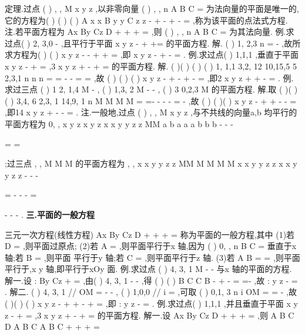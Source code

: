 \textcolor{lyred}{定理}.过点
(
)
,
,
M
x
y z
,以非零向量
(
)
, ,
n
A B C
=
\rho 
为法向量的平面\Pi 是唯一的, 
它的方程为(
)
(
)
(
)
A x
x
B y
y
C z
z
-
+
-
+
-
=
,称为该平面的\textcolor{lyred}{点法式方程}. 
\textcolor{lyred}{注}.若平面方程为
Ax
By
Cz
D
+
+
+
=
,则
(
)
, ,
n
A B C
=
\rho 
为其法向量. 
\textcolor{lyred}{例}.求过点(
)
2, 3,0
-
,且平行于平面
x
y
z
-
+
+=
的平面方程. 
解.
(
)
1, 2,3
n =
-
\rho 
,故所求方程为(
)
(
)
x
y
z
-
-
+
+
=
,即
x
y
z
-
+
-
=
. 
\textcolor{lyred}{例}.求过点(
)
1,1,1 ,垂直于平面
x
y
z
-
+
=
,3
x
y
z
+
-
+
=
的平面方程. 
解.
(
)(
)
(
)
(
)
1, 1,1
3,2, 12
10,15,5
5 2,3,1
n
n
n
=
\times 
=
-
\times 
-
=
=
\rho 
\rho 
\rho 
,故 
(
)
(
)
(
)
x
y
z
\cdots 
-
+\cdots 
-
+\cdots 
-
=
,即2
x
y
z
+
+
-
=
. 
\textcolor{lyred}{例}.求过三点
(
)
1 2, 1,4
M
-
,
(
)
1,3, 2
M
-
-
,
(
)
3 0,2,3
M
的平面方程. 
解.取
(
)(
)
(
)
3,4, 6
2,3, 1
14,9, 1
n
M M
M M
=
\times 
=-
-
\times -
-
=
-
\xi \xi \xi \xi \xi \xi \rho 
\xi \xi \xi \xi \xi \xi \rho 
\rho 
,故 
(
)
(
)(
)
x
y
z
\cdots 
-
+\cdots 
+
-
-
=
,即14
x
y
z
+
-
-
=
. 
\textcolor{lyred}{注}.一般地,过点
(
)
,
,
M
x
y z
,与不共线的向量a\rho ,b
\rho 
均平行的平面方程为 
0, ,
x
y
z
x
y
z
x x
y y
z z
MM a b
a
a
a
b
b
b
-
-
-

=\Leftrightarrow 
=


\xi \xi \xi \xi \xi \rho 
\rho 
\rho 
;过三点
,
,
M M
M 的平面方程为
,
,
x
x
y
y
z
z
MM M M M M
x
x
y
y
z
z
x
x
y
y
z
z
-
-
-

=
\Leftrightarrow 
-
-
-
=


-
-
-
\xi \xi \xi \xi \xi \rho \xi \xi \xi \xi \xi \xi \rho \xi \xi \xi \xi \xi \xi \rho 
. 
\vspace{4pt}
{\bfseries \textcolor{lyred}{三.平面的一般方程}}

三元一次方程(线性方程)
Ax
By
Cz
D
+
+
+
=
称为平面的\textcolor{lyred}{一般方程},其中 
(1)若
D =
,则平面过原点; 
(2)若
A =
,则平面平行于x 轴,因为
(
)
0, ,
n
B C
=
\rho 
垂直于x 轴;若
B =
,则平面 
平行于y 轴;若
C =
,则平面平行于z 轴. 
(3)若
A
B
=
=
,则平面平行于,x y 轴,即平行于xOy 面. 
\textcolor{lyred}{例}.求过点
(
)
4, 3, 1
M
-
-
与x 轴的平面\Pi 的方程. 
解一.设
:
By
Cz
\Pi 
+
=
,由(
)
4, 3, 1
-
-
\in \Pi ,得
(
)
(
)
B
C
C
B
-
+
-
=
\Rightarrow 
=-
,故 
:
y
z
\Pi 
-
=
. 
解二.
(
)
4, 3, 1 //
OM =
-
-
\Pi 
\xi \xi \xi \xi \rho 
,
(
)
1,0,0 //
i =
\Pi 
\rho 
,可取
(
)
0,1, 3
n
i
OM
=\times 
=
-
\xi \xi \xi \xi \rho 
\rho 
\rho 
,故 
(
)(
)
(
)
x
y
z
\cdots 
-
+
+
-\cdots 
+
=
,即
:
y
z
\Pi 
-
=
. 
\textcolor{lyred}{例}.求过点(
)
1,1,1 ,并且垂直于平面
x
y
z
-
+
=
,3
x
y
z
+
-
+
=
的平面方程. 
解一.设
Ax
By
Cz
D
+
+
+
=
,则
A
B
C
D
A
B
C
A
B
C
+
+
+
=


